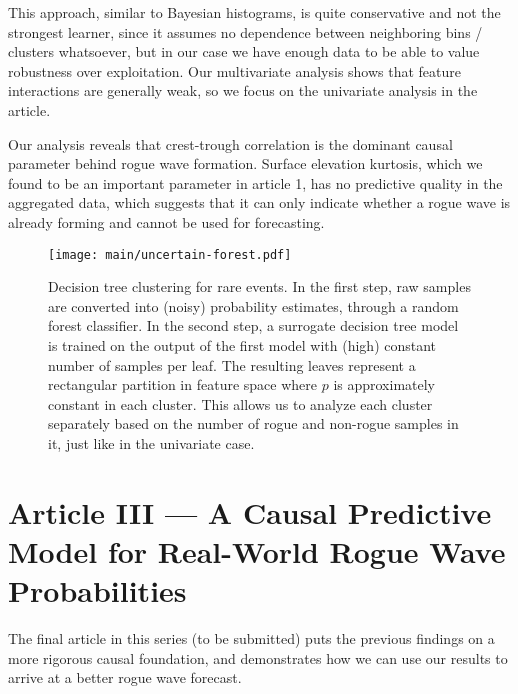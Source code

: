 This approach, similar to Bayesian histograms, is quite conservative and not the strongest learner, since it assumes no dependence between neighboring bins / clusters whatsoever, but in our case we have enough data to be able to value robustness over exploitation. Our multivariate analysis shows that feature interactions are generally weak, so we focus on the univariate analysis in the article.

Our analysis reveals that crest-trough correlation is the dominant causal parameter behind rogue wave formation. Surface elevation kurtosis, which we found to be an important parameter in article 1, has no predictive quality in the aggregated data, which suggests that it can only indicate whether a rogue wave is already forming and cannot be used for forecasting.

\begin{figure}
    \strictpagechecktrue
    \begin{whole}
        \texttt{[image: main/uncertain-forest.pdf]}
    \end{whole}
    \caption{Decision tree clustering for rare events. In the first step, raw samples are converted into (noisy) probability estimates, \eg through a random forest classifier. In the second step, a surrogate decision tree model is trained on the output of the first model with (high) constant number of samples per leaf. The resulting leaves represent a rectangular partition in feature space where $p$ is approximately constant in each cluster. This allows us to analyze each cluster separately based on the number of rogue and non-rogue samples in it, just like in the univariate case.} \label{fig:uncertain-forest}
\end{figure}


\cleardoublepage
\section{Article III --- A Causal Predictive Model for Real-World Rogue Wave Probabilities} \label{sec:causalrogue}

%
The final article in this series (to be submitted) puts the previous findings on a more rigorous causal foundation, and demonstrates how we can use our results to arrive at a better rogue wave forecast.

